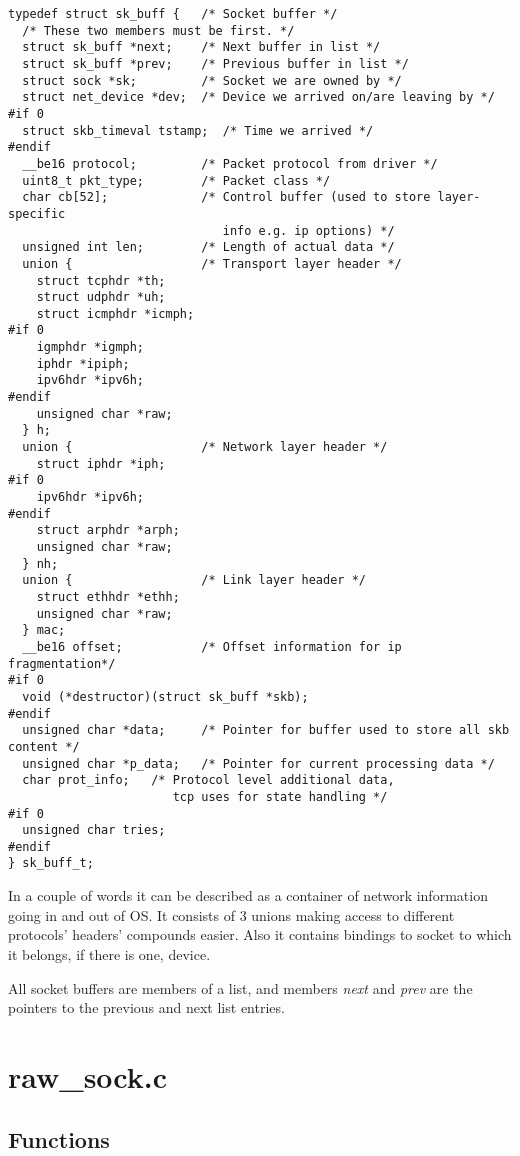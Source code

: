 \documentclass[12pt,a4paper]{article}
\begin{document}
\begin{verbatim}
typedef struct sk_buff {   /* Socket buffer */
  /* These two members must be first. */
  struct sk_buff *next;    /* Next buffer in list */
  struct sk_buff *prev;    /* Previous buffer in list */
  struct sock *sk;         /* Socket we are owned by */
  struct net_device *dev;  /* Device we arrived on/are leaving by */
#if 0
  struct skb_timeval tstamp;  /* Time we arrived */
#endif
  __be16 protocol;         /* Packet protocol from driver */
  uint8_t pkt_type;        /* Packet class */
  char cb[52];             /* Control buffer (used to store layer-specific
                              info e.g. ip options) */
  unsigned int len;        /* Length of actual data */
  union {                  /* Transport layer header */
    struct tcphdr *th;
    struct udphdr *uh;
    struct icmphdr *icmph;
#if 0
    igmphdr *igmph;
    iphdr *ipiph;
    ipv6hdr *ipv6h;
#endif
    unsigned char *raw;
  } h;
  union {                  /* Network layer header */
    struct iphdr *iph;
#if 0
    ipv6hdr *ipv6h;
#endif
    struct arphdr *arph;
    unsigned char *raw;
  } nh;
  union {                  /* Link layer header */
    struct ethhdr *ethh;
    unsigned char *raw;
  } mac;
  __be16 offset;           /* Offset information for ip fragmentation*/
#if 0
  void (*destructor)(struct sk_buff *skb);
#endif
  unsigned char *data;     /* Pointer for buffer used to store all skb content */
  unsigned char *p_data;   /* Pointer for current processing data */
  char prot_info;   /* Protocol level additional data,
                       tcp uses for state handling */
#if 0
  unsigned char tries;
#endif
} sk_buff_t;
\end{verbatim}

In a couple of words it can be described as a container of network information
going in and out of OS. It consists of 3 unions making access to different
protocols' headers' compounds easier. Also it contains bindings to socket to which it
belongs, if there is one, device.

All socket buffers are members of a list, and members {\it next} and {\it prev}
are the pointers to the previous and next list entries.

\newpage
\section{raw\_sock.c}
\label{sec:raw_sock_c}

\subsection{Functions}
\end{document}
